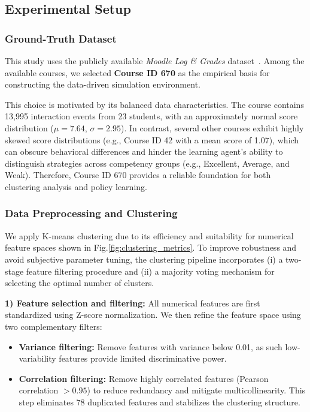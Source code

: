 \documentclass[9pt, conference, a4paper, compsocconf]{IEEEtran}
\begin{document}
\subsection{Experimental Setup}

\subsubsection{Ground-Truth Dataset}
This study uses the publicly available \textit{Moodle Log \& Grades} dataset~\cite{dataset_kaggle}. Among the available courses, we selected \textbf{Course ID 670} as the empirical basis for constructing the data-driven simulation environment.

This choice is motivated by its balanced data characteristics. The course contains 13{,}995 interaction events from 23 students, with an approximately normal score distribution ($\mu = 7.64$, $\sigma = 2.95$). In contrast, several other courses exhibit highly skewed score distributions (e.g., Course ID 42 with a mean score of 1.07), which can obscure behavioral differences and hinder the learning agent's ability to distinguish strategies across competency groups (e.g., Excellent, Average, and Weak). Therefore, Course ID 670 provides a reliable foundation for both clustering analysis and policy learning.

\subsubsection{Data Preprocessing and Clustering}
We apply K-means clustering due to its efficiency and suitability for numerical feature spaces shown in Fig.\ref{fig:clustering_metrics}. To improve robustness and avoid subjective parameter tuning, the clustering pipeline incorporates (i) a two-stage feature filtering procedure and (ii) a majority voting mechanism for selecting the optimal number of clusters.

\textbf{1) Feature selection and filtering:}
All numerical features are first standardized using Z-score normalization. We then refine the feature space using two complementary filters:
\begin{itemize}
    \item \textbf{Variance filtering:} Remove features with variance below 0.01, as such low-variability features provide limited discriminative power.
    \item \textbf{Correlation filtering:} Remove highly correlated features (Pearson correlation $> 0.95$) to reduce redundancy and mitigate multicollinearity. This step eliminates 78 duplicated features and stabilizes the clustering structure.
\end{itemize}
\end{document}
